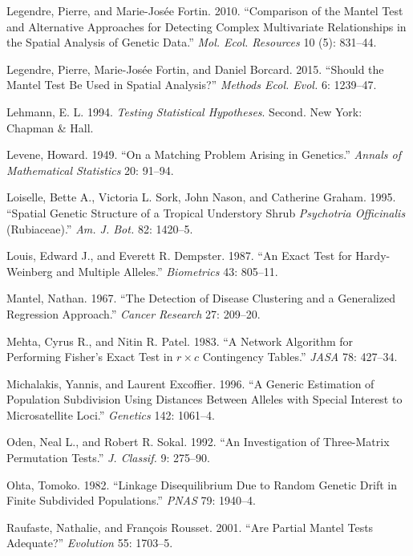 \documentclass[12pt,]{book}
\theoremstyle{definition}
\theoremstyle{definition}
\theoremstyle{definition}
\theoremstyle{remark}
\begin{document}
\hypertarget{ref-LegendreF10}{}
Legendre, Pierre, and Marie-Josée Fortin. 2010. ``Comparison of the
Mantel Test and Alternative Approaches for Detecting Complex
Multivariate Relationships in the Spatial Analysis of Genetic Data.''
\emph{Mol. Ecol. Resources} 10 (5): 831--44.

\hypertarget{ref-LegendreFB15}{}
Legendre, Pierre, Marie-Josée Fortin, and Daniel Borcard. 2015. ``Should
the Mantel Test Be Used in Spatial Analysis?'' \emph{Methods Ecol.
Evol.} 6: 1239--47.

\hypertarget{ref-Lehmann94test}{}
Lehmann, E. L. 1994. \emph{Testing Statistical Hypotheses}. Second. New
York: Chapman \& Hall.

\hypertarget{ref-Levene49}{}
Levene, Howard. 1949. ``On a Matching Problem Arising in Genetics.''
\emph{Annals of Mathematical Statistics} 20: 91--94.

\hypertarget{ref-LoiselleSNG95}{}
Loiselle, Bette A., Victoria L. Sork, John Nason, and Catherine Graham.
1995. ``Spatial Genetic Structure of a Tropical Understory Shrub
\emph{Psychotria Officinalis} (Rubiaceae).'' \emph{Am. J. Bot.} 82:
1420--5.

\hypertarget{ref-LouisD87}{}
Louis, Edward J., and Everett R. Dempster. 1987. ``An Exact Test for
Hardy-Weinberg and Multiple Alleles.'' \emph{Biometrics} 43: 805--11.

\hypertarget{ref-Mantel67}{}
Mantel, Nathan. 1967. ``The Detection of Disease Clustering and a
Generalized Regression Approach.'' \emph{Cancer Research} 27: 209--20.

\hypertarget{ref-MehtaP83}{}
Mehta, Cyrus R., and Nitin R. Patel. 1983. ``A Network Algorithm for
Performing Fisher's Exact Test in \(r \times
	c\) Contingency Tables.'' \emph{JASA} 78: 427--34.

\hypertarget{ref-MichalakisE96}{}
Michalakis, Yannis, and Laurent Excoffier. 1996. ``A Generic Estimation
of Population Subdivision Using Distances Between Alleles with Special
Interest to Microsatellite Loci.'' \emph{Genetics} 142: 1061--4.

\hypertarget{ref-OdenS92}{}
Oden, Neal L., and Robert R. Sokal. 1992. ``An Investigation of
Three-Matrix Permutation Tests.'' \emph{J. Classif.} 9: 275--90.

\hypertarget{ref-Ohta82p}{}
Ohta, Tomoko. 1982. ``Linkage Disequilibrium Due to Random Genetic Drift
in Finite Subdivided Populations.'' \emph{PNAS} 79: 1940--4.

\hypertarget{ref-RaufasteR01}{}
Raufaste, Nathalie, and François Rousset. 2001. ``Are Partial Mantel
Tests Adequate?'' \emph{Evolution} 55: 1703--5.
\end{document}
